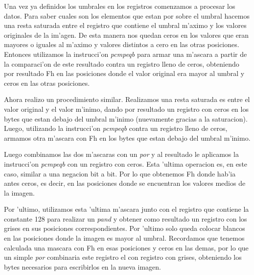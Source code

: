 Una vez ya definidos los umbrales en los registros comenzamos a procesar los datos. Para saber cuales son los elementos que estan por
sobre el umbral hacemos una resta saturada entre el registro que contiene el umbral m'aximo y los valores originales de la im'agen. De esta manera nos quedan ceros en los valores que eran mayores o iguales al m'aximo y valores distintos a cero en las otras posiciones. Entonces utilizamos 
la instrucci'on \textit{pcmpeqb} para armar una m'ascara a partir de la comparaci'on de este resultado contra un registro lleno de ceros, obteniendo por resultado Fh en las posiciones donde el valor original era mayor al umbral y ceros en las otras posiciones.

Ahora realizo un procedimiento similar. Realizamos una resta saturada es entre el valor original y el valor m'inimo, dando por resultado un registro con ceros en los bytes que estan debajo del umbral m'inimo (nuevamente gracias a la saturacion). Luego, utilizando la instrucci'on \textit{pcmpeqb} contra un registro lleno de ceros, armamos otra m'ascara con Fh en los bytes que estan debajo del umbral m'inimo.

Luego combinamos las dos m'ascaras con un \textit{por} y al resultado le aplicamos la instrucci'on \textit{pcmpeqb} con
un registro con ceros. Esta 'ultima operacion es, en este caso, similar a una negacion bit a bit. Por lo que obtenemos Fh donde hab'ia antes ceros, es decir, en las posiciones donde se encuentran los valores medios de la imagen.

Por 'ultimo, utilizamos esta 'ultima m'ascara junto con el registro que contiene la constante 128 para realizar un \textit{pand} y obtener como resultado un registro con los grises en sus posiciones correspondientes. Por 'ultimo solo queda colocar blancos en las posiciones donde la imagen es mayor al umbral. Recordamos que tenemos calculada una mascara con Fh en esas posiciones y ceros en las demas, por lo que un simple \textit{por} combinaria este registro el con registro con grises, obteniendo los bytes necesarios para escribirlos en la nueva imagen.
